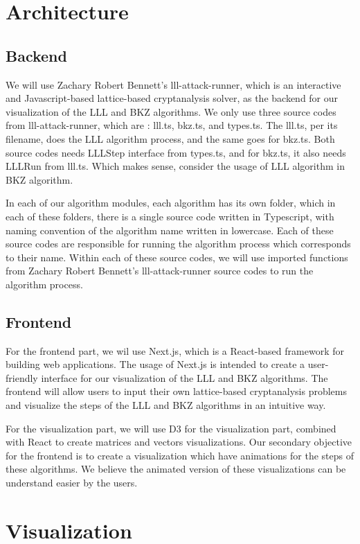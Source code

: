 \documentclass[runningheads]{llncs}
\begin{document}
\section{Architecture}

\subsection{Backend}
We will use Zachary Robert Bennett's lll-attack-runner, which is an interactive and Javascript-based lattice-based cryptanalysis solver, as the backend for our visualization of the LLL and BKZ algorithms. We only use three source codes from lll-attack-runner, which are : lll.ts, bkz.ts, and types.ts. The lll.ts, per its filename, does the LLL algorithm process, and the same goes for bkz.ts. Both source codes needs LLLStep interface from types.ts, and for bkz.ts, it also needs LLLRun from lll.ts. Which makes sense, consider the usage of LLL algorithm in BKZ algorithm. 

In each of our algorithm modules, each algorithm has its own folder, which in each of these folders, there is a single source code written in Typescript, with naming convention of the algorithm name written in lowercase. Each of these source codes are responsible for running the algorithm process which corresponds to their name. Within each of these source codes, we will use imported functions from Zachary Robert Bennett's lll-attack-runner source codes to run the algorithm process.  

\subsection{Frontend}
For the frontend part, we wil use Next.js, which is a React-based framework for building web applications. The usage of Next.js is intended to create a user-friendly interface for our visualization of the LLL and BKZ algorithms. The frontend will allow users to input their own lattice-based cryptanalysis problems and visualize the steps of the LLL and BKZ algorithms in an intuitive way.

For the visualization part, we will use D3 for the visualization part, combined with React to create matrices and vectors visualizations. Our secondary objective for the frontend is to create a visualization which have animations for the steps of these algorithms. We believe the animated version of these visualizations can be understand easier by the users. 

\section{Visualization}
\end{document}
